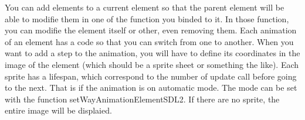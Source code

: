 \begin{DoxyItemize}
You can add elements to a current element so that the parent element will be able to modifie them in one of the function you binded to it. In those function, you can modifie the element itself or other, even removing them. Each animation of an element has a code so that you can switch from one to another. When you want to add a step to the animation, you will have to define its coordinates in the image of the element (which should be a sprite sheet or something the like). Each sprite has a lifespan, which correspond to the number of update call before going to the next. That is if the animation is on \textquotesingle{}automatic\textquotesingle{} mode. The mode can be set with the function set\+Way\+Animation\+Element\+S\+D\+L2. If there are no sprite, the entire image will be displaied. ~\newline
~\newline
 
\end{DoxyItemize}